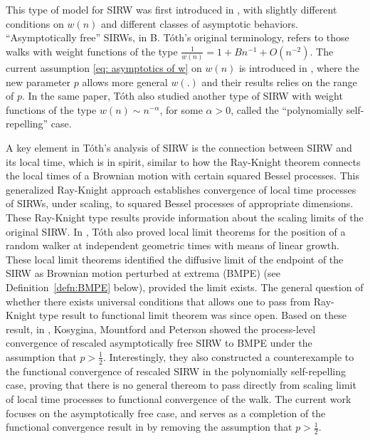 \documentclass[twoside,12pt, a4paper]{article}
\numberwithin{equation}{section}
\theoremstyle{remark}
\newcommand\TBD{\textcolor{red}{TBD.}}
\newcommand{\comment}[1]{\textcolor{blue}{(Comment: #1)}}
\begin{document}
	
	This type of model for SIRW was first introduced in \cite{T96}, with slightly different conditions on $w(n)$ and different classes of asymptotic behaviors. ``Asymptotically free'' SIRWs, in B. T\'oth's original terminology, refers to those walks with weight functions of the type $\frac{1}{w(n)} = 1 + B n^{-1} + O(n^{-2})$. 
	The current assumption \eqref{eq: asymptotics of w} on $w(n)$ is introduced in \cite{KMP23}, where the new parameter $p$ allows more general $w(.)$ and their results relies on the range of $p$. 
	In the same paper, T\'oth also studied another type of SIRW with weight functions of the type $w(n)\sim n^{-\alpha}$, for some $\alpha >0$, called the ``polynomially self-repelling'' case. 
	
	A key element in T\'oth's analysis of SIRW is the connection between SIRW and its local time, which is in spirit, similar to how the Ray-Knight theorem connects the local times of a Brownian motion with certain squared Bessel processes. 
		This generalized Ray-Knight approach establishes convergence of local time processes of SIRWs, under scaling, to squared Bessel processes of appropriate dimensions. These Ray-Knight type results provide information about the scaling limits of the original SIRW.
 In \cite{T96}, T\'oth also proved local limit theorems for the position of a random walker at independent geometric times with means of linear growth. 
	These local limit theorems identified the diffusive limit of the endpoint of the SIRW as Brownian motion perturbed at extrema (BMPE) (see Definition~\ref{defn:BMPE} below), provided the limit exists. 
	The general question of whether there exists universal conditions that allows one to pass from Ray-Knight type result to functional limit theorem was since open.
	Based on these result, in \cite{KMP23}, Kosygina, Mountford and Peterson showed the process-level convergence of rescaled asymptotically free SIRW to BMPE under the assumption that $p > \frac{1}{2}$. Interestingly, they also constructed a counterexample to the functional convergence of rescaled SIRW in the polynomially self-repelling case, proving that there is no general thereom to pass directly from scaling limit of local time processes to functional convergence of the walk. 
	The current work focuses on the asymptotically free case, and serves as a completion of the functional convergence result in \cite{KMP23} by removing the assumption that $p > \frac{1}{2}$.
	
\end{document}
